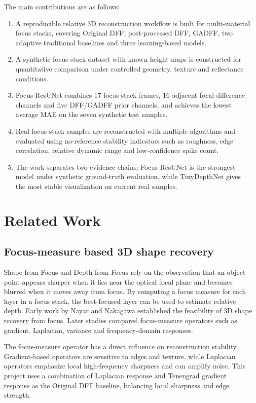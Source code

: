 \documentclass[11pt,a4paper]{article}
\begin{document}
The main contributions are as follows:
\begin{enumerate}
  \item A reproducible relative 3D reconstruction workflow is built for multi-material focus stacks, covering Original DFF, post-processed DFF, GADFF, two adaptive traditional baselines and three learning-based models.
  \item A synthetic focus-stack dataset with known height maps is constructed for quantitative comparison under controlled geometry, texture and reflectance conditions.
  \item Focus-ResUNet combines 17 focus-stack frames, 16 adjacent focal-difference channels and five DFF/GADFF prior channels, and achieves the lowest average MAE on the seven synthetic test samples.
  \item Real focus-stack samples are reconstructed with multiple algorithms and evaluated using no-reference stability indicators such as roughness, edge correlation, relative dynamic range and low-confidence spike count.
  \item The work separates two evidence chains: Focus-ResUNet is the strongest model under synthetic ground-truth evaluation, while TinyDepthNet gives the most stable visualization on current real samples.
\end{enumerate}

\section{Related Work}

\subsection{Focus-measure based 3D shape recovery}

Shape from Focus and Depth from Focus rely on the observation that an object point appears sharper when it lies near the optical focal plane and becomes blurred when it moves away from focus. By computing a focus measure for each layer in a focus stack, the best-focused layer can be used to estimate relative depth. Early work by Nayar and Nakagawa established the feasibility of 3D shape recovery from focus. Later studies compared focus-measure operators such as gradient, Laplacian, variance and frequency-domain responses.

The focus-measure operator has a direct influence on reconstruction stability. Gradient-based operators are sensitive to edges and texture, while Laplacian operators emphasize local high-frequency sharpness and can amplify noise. This project uses a combination of Laplacian response and Tenengrad gradient response as the Original DFF baseline, balancing local sharpness and edge strength.
\end{document}
